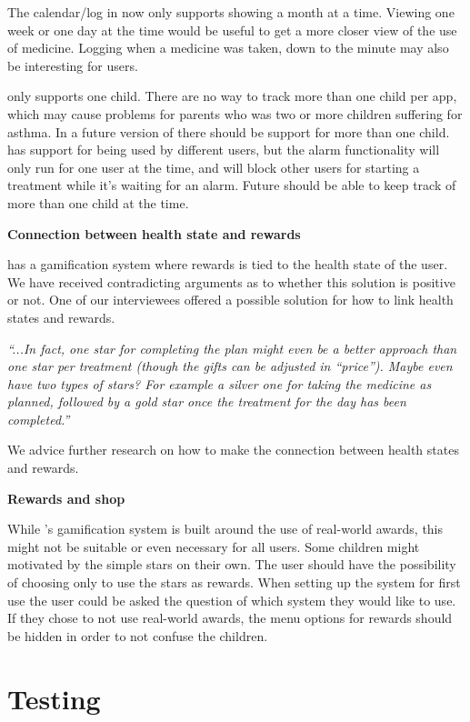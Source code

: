 The calendar/log in \app{} now only supports showing a month at a time. Viewing one week or one day at the time would be useful to get a more closer view of the use of medicine. Logging when a medicine was taken, down to the minute may also be interesting for users. 

\app{} only supports one child. There are no way to track more than one child per app, which may cause problems for parents who was two or more children suffering for asthma. In a future version of \app{} there should be support for more than one child. \ab{} has support for being used by different users, but the alarm functionality will only run for one user at the time, and will block other users for starting a treatment while it's waiting for an alarm. Future \ab{} should be able to keep track of more than one child at the time. 

\textbf{Connection between health state and rewards}

\app{} has a gamification system where rewards is tied to the health state of the user. We have received contradicting arguments as to whether this solution is positive or not. One of our interviewees offered a possible solution for how to link health states and rewards.

\emph{``...In fact, one star for completing the plan might even be a better approach than one star per treatment (though the gifts can be adjusted in ``price''). Maybe even have two types of stars? For example a silver one for taking the medicine as planned, followed by a gold star once the treatment for the day has been completed.''}

We advice further research on how to make the connection between health states and rewards. 

\textbf{Rewards and shop}

While \app{}'s gamification system is built around the use of real-world awards, this might not be suitable or even necessary for all users. Some children might motivated by the simple stars on their own. The user should have the possibility of choosing only to use the stars as rewards. When setting up the system for first use the user could be asked the question of which system they would like to use. If they chose to not use real-world awards, the menu options for rewards should be hidden in order to not confuse the children. 

\section{Testing}
\label{sec:furtherworktesting}

